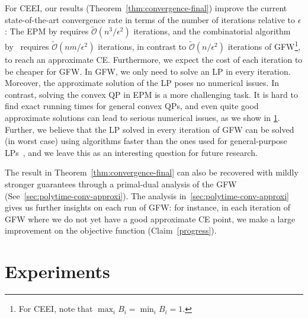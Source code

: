 \documentclass[format=acmsmall,authorversion]{acmart}
\newtheorem{remark}[theorem]{Remark}
\newcommand{\ck}[1]{{\textcolor{red}{CK: #1}}}
\begin{document}


For CEEI, our results (Theorem~\ref{thm:convergence-final}) improve the current state-of-the-art convergence rate in terms of the number of iterations relative to $\epsilon$: The EPM by \citet{boodaghians2022polynomial} requires $\mathcal{\tilde{O}}(n^3/\epsilon^2)$ iterations, and the combinatorial algorithm by~\citet{ChaudhuryGMM22}  requires $\mathcal{\tilde{O}}(nm/\epsilon^2)$ iterations, in contrast to $\mathcal{{\tilde{O}}}(n/\epsilon^2)$ iterations of GFW\footnote{For CEEI, note that $\max_iB_i = \min_i B_i = 1$.}, to reach an approximate CE. Furthermore, we expect the cost of each iteration to be cheaper for GFW. In GFW, we only need to solve an LP in every iteration. Moreover, the approximate solution of the LP poses no numerical issues. In contrast, solving the convex QP in EPM is a more challenging task. It is hard to find exact running times for general convex QPs, and even quite good approximate solutions can lead to serious numerical issues, as we show in \cref{sec:experiments}. Further, we believe that the LP solved in every iteration of GFW can be solved (in worst case) using algorithms faster than the ones used for general-purpose LPs~\cite {van2020deterministic}, and we leave this as an interesting question for future research.

The result in Theorem~\ref{thm:convergence-final} can also be recovered with mildly stronger guarantees through a primal-dual analysis of the GFW (See~\cref{sec:polytime-conv-approxi}).  The analysis in~\cref{sec:polytime-conv-approxi} gives us further insights on each run of GFW: for instance, in each iteration of GFW where we do not yet have a good approximate CE point, we make a large improvement on the objective function (Claim~\ref{progress}).

 


\section{Experiments} 
\label{sec:experiments}
\end{document}
